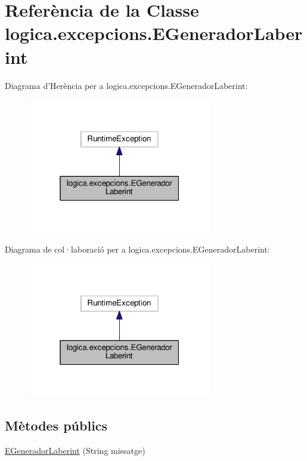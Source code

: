 \hypertarget{classlogica_1_1excepcions_1_1_e_generador_laberint}{\section{Referència de la Classe logica.\+excepcions.\+E\+Generador\+Laberint}
\label{classlogica_1_1excepcions_1_1_e_generador_laberint}
}


Diagrama d'Herència per a logica.\+excepcions.\+E\+Generador\+Laberint\+:\nopagebreak
\begin{figure}[H]
\begin{center}
\leavevmode
\includegraphics[width=229pt]{classlogica_1_1excepcions_1_1_e_generador_laberint__inherit__graph}
\end{center}
\end{figure}


Diagrama de col·laboració per a logica.\+excepcions.\+E\+Generador\+Laberint\+:\nopagebreak
\begin{figure}[H]
\begin{center}
\leavevmode
\includegraphics[width=229pt]{classlogica_1_1excepcions_1_1_e_generador_laberint__coll__graph}
\end{center}
\end{figure}
\subsection*{Mètodes públics}
\begin{DoxyCompactItemize}
\item 
\hyperlink{classlogica_1_1excepcions_1_1_e_generador_laberint_a011bff23b73bf1d2fae65bdf3216a4c0}{E\+Generador\+Laberint} (String missatge)
\end{DoxyCompactItemize}


